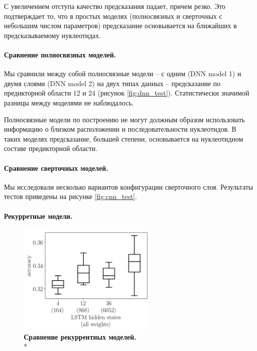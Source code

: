 С увеличением отступа качество предсказания падает, причем резко. Это подтверждает то, что в простых моделях (полносвязных и сверточных с небольшим числом параметров) предсказание основывается на ближайших в предсказываемому нуклеотидах.


 
 \paragraph{Сравнение полносвязных моделей.} Мы сравнили между собой полносвязные модели -- с одним (DNN model 1) и двумя слоями (DNN model 2)  на двух типах данных -- предсказание по предикторной области 12 и 24 (рисунок \ref{fig:dnn_test}). Статистически значимой разницы между моделями не наблюдалось.
 
 Полносвязные модели по построению не могут должным образом использовать информацию о близком расположении и последовательности нуклеотидов. В таких моделях предсказание, большей степени, основывается на нуклеотидном составе предикторной области.
 



\paragraph{Сравнение сверточных моделей.} Мы исследовали несколько вариантов конфигурации сверточного слоя. Результаты тестов приведены на рисунке \ref{fig:cnn_test}.




\paragraph{Рекурретные модели.}
\begin{figure}[h] %
	\centering
	\includegraphics[width = 0.6\textwidth]{pics/rnn_models_all_runs_p1_ecoli_100000_10000_50_0.png}
	\caption{{\bfseries Сравнение рекуррентных моделей.} \\* 
		   \mannwhitni }
	\label{fig:rnn_test}	
\end{figure}

	